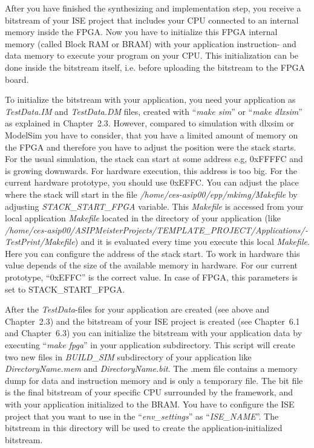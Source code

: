 After you have finished the synthesizing and implementation step, you
receive a bitstream of your ISE project that includes your CPU connected
to an internal memory inside the FPGA. Now you have to initialize this
FPGA internal memory (called Block RAM or BRAM) with your application
instruction- and data memory to execute your program on your CPU. This
initialization can be done inside the bitstream itself, i.e. before
uploading the bitstream to the FPGA board.

To initialize the bitstream with your application, you need your
application as \emph{TestData.IM} and \emph{TestData.DM} files, created
with ``\emph{make sim}'' or ``\emph{make dlxsim}'' as explained in
Chapter~2.3. However, compared to simulation with dlxsim or ModelSim you
have to consider, that you have a limited amount of memory on the FPGA
and therefore you have to adjust the position were the stack starts. For
the usual simulation, the stack can start at some address e.g, 0xFFFFC
and is growing downwards. For hardware execution, this address is too
big. For the current hardware prototype, you should use 0xEFFC. You can
adjust the place where the stack will start in the file
\emph{/home/ces-asip00/epp/mkimg/Makefile} by adjusting
\emph{STACK\_START\_FPGA} variable. This \emph{Makefile} is accessed
from your local application \emph{Makefile} located in the directory of
your application (like
\emph{/home/ces-asip00/­ASIPMeisterProjects/­TEMPLATE\_PROJECT/­Applications/­TestPrint/Makefile})
and it is evaluated every time you execute this local \emph{Makefile}.
Here you can configure the address of the stack start. To work in
hardware this value depends of the size of the available memory in
hardware. For our current prototype, ``0xEFFC'' is the correct value. In
case of FPGA, this parameters is set to STACK\_START\_FPGA.

After the \emph{TestData}-files for your application are created (see
above and Chapter~2.3) and the bitstream of your ISE project is created
(see Chapter~6.1 and Chapter~6.3) you can initialize the bitstream with
your application data by executing ``\emph{make fpga}'' in your
application subdirectory. This script will create two new files in
\emph{BUILD\_SIM} subdirectory of your application like
\emph{DirectoryName.mem} and \emph{DirectoryName.bit}. The .mem file
contains a memory dump for data and instruction memory and is only a
temporary file. The bit file is the final bitstream of your specific CPU
surrounded by the framework, and with your application initialized to
the BRAM. You have to configure the ISE project that you want to use in
the ``\emph{env\_settings}'' as ``\emph{ISE\_NAME}''. The bitstream in
this directory will be used to create the application-initialized
bitstream.

